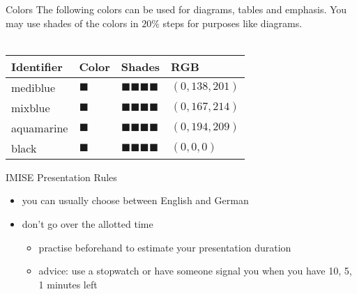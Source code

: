 \documentclass[aspectratio=1610,12pt]{beamer}
\begin{document}
\begin{frame}{Colors}
The following colors can be used for diagrams, tables and emphasis.
You may use shades of the colors in $20 \%$ steps for purposes like diagrams.\\
~\\
\centering
\scalebox{1.5}
{
\begin{tabulary}{\textwidth}{llll}
\toprule
Identifier	&Color					&Shades																		&RGB\\
\midrule
mediblue   	&\Huge\color{mediblue}$\blacksquare$	&\Huge\color{mediblue!80}$\blacksquare$\color{mediblue!60}$\blacksquare$\color{mediblue!40}$\blacksquare$\color{mediblue!20}$\blacksquare$	&$(0,138,201)$\\
mixblue   	&\Huge\color{mixblue}$\blacksquare$	&\Huge\color{mixblue!80}$\blacksquare$\color{mixblue!60}$\blacksquare$\color{mixblue!40}$\blacksquare$\color{mixblue!20}$\blacksquare$	&$(0,167,214)$\\
aquamarine	&\Huge\color{aquamarine}$\blacksquare$	&\Huge\color{aquamarine!80}$\blacksquare$\color{aquamarine!60}$\blacksquare$\color{aquamarine!40}$\blacksquare$\color{aquamarine!20}$\blacksquare$	&$(0,194,209)$\\
black		&\Huge\color{black}$\blacksquare$	&\Huge\color{black!80}$\blacksquare$\color{black!60}$\blacksquare$\color{black!40}$\blacksquare$\color{black!20}$\blacksquare$	&$(0,0,0)$\\
\bottomrule
\end{tabulary}
}
\end{frame}


\begin{frame}{IMISE Presentation Rules}
\begin{itemize}
\item you can usually choose between English and German
\item don't go over the allotted time
\begin{itemize}
\item practise beforehand to estimate your presentation duration 
\item advice: use a stopwatch or have someone signal you when you have 10, 5, 1 minutes left
\end{itemize}
\end{itemize}
\end{frame}
\end{document}
